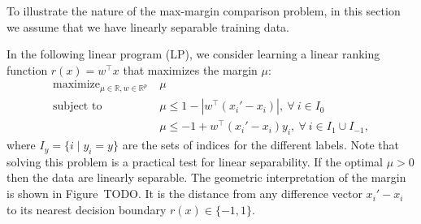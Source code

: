 \documentclass{article}
\newcommand{\RR}{\mathbb R}
\DeclareMathOperator*{\maximize}{maximize}
\begin{document}
To illustrate the nature of the max-margin comparison problem, in this
section we assume that we have linearly separable training data.

In the following linear program (LP), we consider learning a linear
ranking function $r(x)=w^\intercal x$ that maximizes the margin $\mu$:
\begin{equation}
  \label{eq:max-margin-lp}
  \begin{aligned}
    \maximize_{\mu\in\RR, w\in\RR^p}\ & \mu \\
    \text{subject to}\ & \mu \leq 1-|w^\intercal (x_i' - x_i)|,\
    \forall\  i\in I_0\\
    &\mu \leq -1 +  w^\intercal(x_i'-x_i)y_i,\ \forall\ i\in I_1\cup I_{-1},
  \end{aligned}
\end{equation}
where $I_y=\{i\mid y_i=y\}$ are the sets of indices for the different
labels. Note that solving this problem is a practical test for linear
separability. If the optimal $\mu>0$ then the data are linearly
separable. The geometric interpretation of the margin is shown in
Figure~TODO. It is the distance from any difference vector $x_i'-x_i$
to its nearest decision boundary $r(x)\in\{-1,1\}$.
\end{document}
